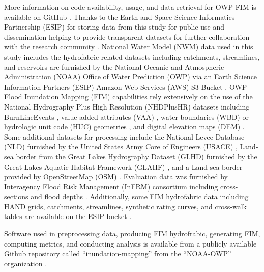 \documentclass[draft]{dependencies/agujournal2019}
\begin{document}
More information on code availability, usage, and data retrieval for OWP FIM is available on GitHub \cite{inundationMapping2022}.
Thanks to the Earth and Space Science Informatics Partnership (ESIP) for storing data from this study for public use and dissemination helping to provide transparent datasets for further collaboration with the research community \cite{esipData2022}.
\clearpage
\openresearch
%
National Water Model (NWM) data used in this study includes the hydrofabric related datasets \cite{nwm2022hydrofabric} including catchments, streamlines, and reservoirs are furnished by the National Oceanic and Atmospheric Administration (NOAA) Office of Water Prediction (OWP) via an Earth Science Information Partners (ESIP) Amazon Web Services (AWS) S3 Bucket \cite{esipData2022}.
OWP Flood Inundation Mapping (FIM) capabilities rely extensively on the use of the National Hydrography Plus High Resolution (NHDPlusHR) datasets including BurnLineEvents \cite{nhdplus2022vectors}, value-added attributes (VAA) \cite{nhdplus2022vectors}, water boundaries (WBD) or hydrologic unit code (HUC) geometries \cite{nhdplus2022wbd}, and digital elevation maps (DEM) \cite{nhdplus2022dems}.
Some additional datasets for processing include the National Levee Database (NLD) furnished by the United States Army Core of Engineers (USACE) \cite{engineers2016national}, Land-sea border from the Great Lakes Hydrography Dataset (GLHD) furnished by the Great Lakes Aquatic Habitat Framework (GLAHF) \cite{GreatLakesHydrographyDataset}, and a Land-sea border provided by OpenStreetMap (OSM) \cite{osm2021landsea}.
Evaluation data was furnished by Interagency Flood Risk Management (InFRM) consortium including cross-sections and flood depths \cite{fema2021base,fema2021estimated}.
Additionally, some FIM hydrofabric data including HAND grids, catchments, streamlines, synthetic rating curves, and cross-walk tables are available on the ESIP bucket \cite{esipData2022}.

Software used in preprocessing data, producing FIM hydrofrabic, generating FIM, computing metrics, and conducting analysis is available from a publicly available Github repository called ``inundation-mapping'' from the ``NOAA-OWP'' organization \cite{inundationMapping2022}.
\clearpage %

%
\end{document}
